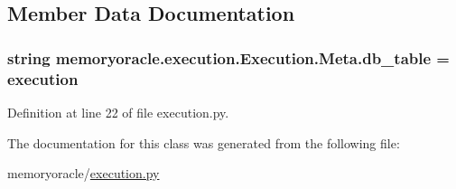 \subsection{Member Data Documentation}
\hypertarget{classmemoryoracle_1_1execution_1_1Execution_1_1Meta_ad4c8c998a7210fb5f3fd75bdaadeb5bc}{}
\subsubsection[{db\+\_\+table}]{\setlength{\rightskip}{0pt plus 5cm}string memoryoracle.\+execution.\+Execution.\+Meta.\+db\+\_\+table = \textquotesingle{}execution\textquotesingle{}\hspace{0.3cm}{\ttfamily [static]}}\label{classmemoryoracle_1_1execution_1_1Execution_1_1Meta_ad4c8c998a7210fb5f3fd75bdaadeb5bc}


Definition at line 22 of file execution.\+py.



The documentation for this class was generated from the following file\+:\begin{DoxyCompactItemize}
\item 
memoryoracle/\hyperlink{execution_8py}{execution.\+py}\end{DoxyCompactItemize}
